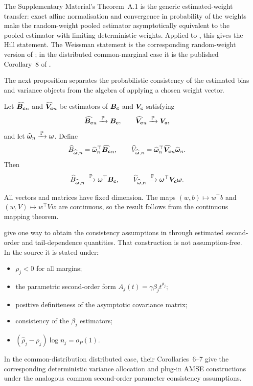 The Supplementary Material's Theorem~A.1 is the generic estimated-weight transfer:
exact affine normalisation and convergence in probability of the weights
make the random-weight pooled estimator asymptotically equivalent to the
pooled estimator with limiting deterministic weights. Applied to
, this gives the Hill statement. The Weissman
statement is the corresponding random-weight version of
; in the distributed common-marginal case it
is the published Corollary~8 of
\textcite{DaouiaPadoanStupfler2021}.

The next proposition separates the probabilistic consistency of the
estimated bias and variance objects from the algebra of applying a
chosen weight vector.

\begin{proposition}
\label{prop:bg:plugin-bias-variance}
Let \(\widehat{\bm{B}_{\bm{c}}}_n\) and \(\widehat{\bm{V}_{\bm{c}}}_n\) be estimators of
\(\bm{B}_{\bm{c}}\) and \(\bm{V}_{\bm{c}}\) satisfying
\[
  \widehat{\bm{B}_{\bm{c}}}_n\xrightarrow{\,\operatorname{\mathbb{P}}\,}\bm{B}_{\bm{c}},
  \qquad
  \widehat{\bm{V}_{\bm{c}}}_n\xrightarrow{\,\operatorname{\mathbb{P}}\,}\bm{V}_{\bm{c}},
\]
and let \(\widehat{\bm\omega}_n\xrightarrow{\,\operatorname{\mathbb{P}}\,}\bm\omega\). Define
\[
  \widehat B_{\widehat{\bm\omega},n}
  =
  \widehat{\bm\omega}_n^\top\widehat{\bm{B}_{\bm{c}}}_n,
  \qquad
  \widehat V_{\widehat{\bm\omega},n}
  =
  \widehat{\bm\omega}_n^\top
  \widehat{\bm{V}_{\bm{c}}}_n
  \widehat{\bm\omega}_n.
\]
Then
\[
  \widehat B_{\widehat{\bm\omega},n}
  \xrightarrow{\,\operatorname{\mathbb{P}}\,}
  \bm\omega^\top\bm{B}_{\bm{c}},
  \qquad
  \widehat V_{\widehat{\bm\omega},n}
  \xrightarrow{\,\operatorname{\mathbb{P}}\,}
  \bm\omega^\top\bm{V}_{\bm{c}}\bm\omega.
\]
\end{proposition}

All vectors and matrices have fixed dimension. The maps
\((w,b)\mapsto w^\top b\) and
\((w,V)\mapsto w^\top Vw\) are continuous, so the result follows from
the continuous mapping theorem.

\textcite[\S2.2 and Corollary~1]{DaouiaPadoanStupfler2021} give one way to
obtain the consistency assumptions in 
through estimated second-order and tail-dependence quantities. That construction
is not assumption-free. In the source it is stated under:
\begin{itemize}
\item \(\rho_j<0\) for all margins;
\item the parametric second-order form \(A_j(t)=\gamma\beta_j t^{\rho_j}\);
\item positive definiteness of the asymptotic covariance matrix;
\item consistency of the \(\beta_j\) estimators;
\item \((\hat\rho_j-\rho_j)\log n_j=o_P(1)\).
\end{itemize}
In the common-distribution distributed case, their Corollaries~6--7 give the
corresponding deterministic variance allocation and plug-in AMSE constructions
under the analogous common second-order parameter consistency assumptions.

